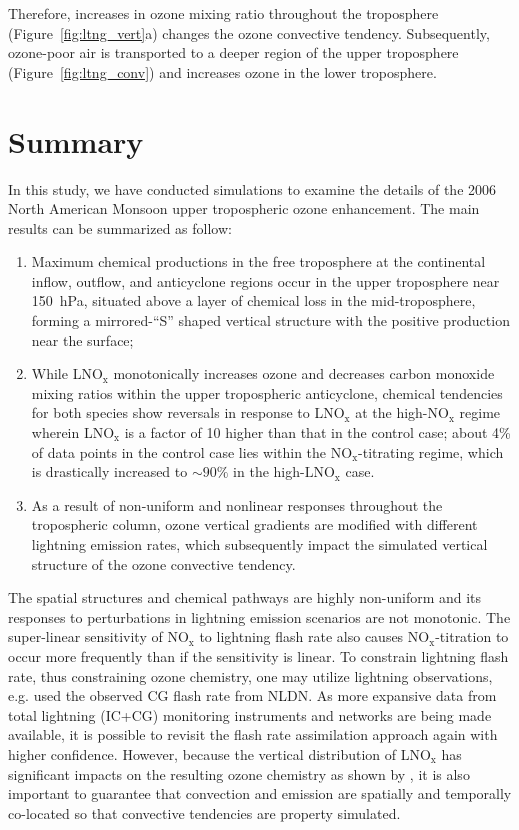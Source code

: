 Therefore, increases in ozone mixing ratio throughout the troposphere (Figure~\ref{fig:ltng_vert}a)
changes the ozone convective tendency. Subsequently, ozone-poor air is transported
to a deeper region of the upper troposphere (Figure~\ref{fig:ltng_conv}) and increases
ozone in the lower troposphere.

\section{Summary}\label{sect:summary}

In this study, we have conducted simulations to examine the details of the
2006 North American Monsoon upper tropospheric ozone enhancement.
The main results can be summarized as follow:
\begin{enumerate}
\item Maximum chemical productions in the free troposphere at the continental
inflow, outflow, and anticyclone regions occur in the upper troposphere near
150~hPa, situated above a layer of chemical loss in the mid-troposphere, forming
a mirrored-``S'' shaped vertical structure with the positive production near the surface;
\item While LNO$_\mathrm{x}$ monotonically increases ozone and decreases
carbon monoxide mixing ratios within the upper tropospheric anticyclone,
chemical tendencies for both species show reversals in
response to LNO$_\mathrm{x}$ at the high-NO$_\mathrm{x}$ regime wherein
LNO$_{\mathrm{x}}$ is a factor of 10 higher than that in the control case; about
4\% of data points in the control case lies within the $\mathrm{NO_x}$-titrating
regime, which is drastically increased to $\sim90\%$ in the high-$\mathrm{LNO_x}$ case.
\item As a result of non-uniform and nonlinear responses throughout the tropospheric column,
ozone vertical gradients are modified with different lightning emission rates, which subsequently impact the
simulated vertical structure of the ozone convective tendency.

\end{enumerate}

The spatial structures and chemical pathways are highly non-uniform and
its responses to perturbations in lightning emission scenarios are not
monotonic. The super-linear sensitivity of NO$_\mathrm{x}$ to lightning flash rate
also causes $\mathrm{NO_x}$-titration to occur more frequently than if the sensitivity is linear.
To constrain lightning flash rate, thus constraining ozone chemistry,
one may utilize lightning observations, e.g. \citet{Cooper:2009nx} used the observed CG
flash rate from NLDN. As more expansive data from total lightning (IC+CG)
monitoring instruments and networks are being made available, it is possible to
revisit the flash rate assimilation approach again with higher confidence. However, because
the vertical distribution of LNO$_\mathrm{x}$ has significant
impacts on the resulting ozone chemistry as shown by \citet{Pickering:1998sh}, it is also important to guarantee
that convection and emission are spatially and temporally co-located so that
convective tendencies are property simulated.

